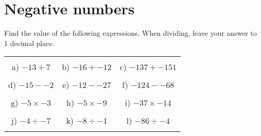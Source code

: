 \documentclass[12pt]{article}
\begin{document}
\section{Negative numbers}
Find the value of the following expressions. When dividing, leave your answer to 1 decimal place.
\begin{table}[h!]
\centering
\begin{tabular}{c c c}
\hspace{5cm} & \hspace{5cm} & \hspace{5cm} \\
a) ${-13} + {7}$ & b) ${-16} + {-12}$ & c) ${-137} + {-151}$ \\ \\
d) ${-15} - {-2}$ & e) ${-12} - {-27}$ & f) ${-124} - {-68}$ \\ \\
g) ${-5}\times{-3}$ & h) ${-5}\times{-9}$ & i) ${-37}\times{-14}$ \\ \\
j) ${-4}\div{-7}$ & k) ${-8}\div{-1}$ & l) ${-86}\div{-4}$ \\ \\
\end{tabular}
\end{table}
\newline
\end{document}
